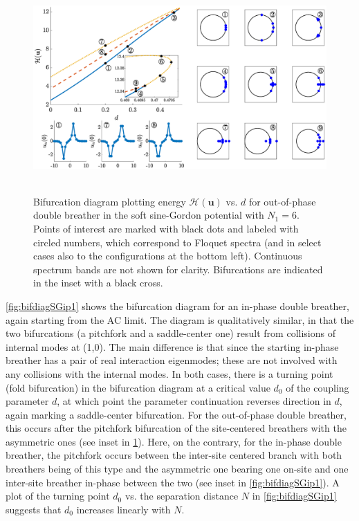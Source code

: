 \documentclass[12pt,reqno]{amsart}
\newcommand{\uvec}{\mathbf{u}}
\theoremstyle{definition}
\begin{document}
\begin{figure}
	\hbox{
	\hspace{-2cm}
	\includegraphics[width=20cm]{bifdiagSGoppositeN6.eps} 
	}
	\caption{Bifurcation diagram plotting energy $\mathcal{H}(\uvec)$ vs. $d$ for out-of-phase double breather in the soft sine-Gordon potential with $N_1 = 6$. Points of interest are marked with black dots and labeled with circled numbers, which correspond to Floquet spectra (and in select cases also to the configurations at the bottom left). Continuous spectrum bands are not shown for clarity. Bifurcations are indicated in the inset with a black cross.}
	\label{fig:bifdiagSGoop1}
\end{figure}

\cref{fig:bifdiagSGip1} shows the bifurcation diagram for an in-phase double breather, again starting from the AC limit. The diagram is qualitatively similar, in that the two bifurcations (a pitchfork
and a saddle-center one) result from collisions of internal modes at (1,0). The main difference is that since the starting in-phase breather has a pair of real interaction eigenmodes; these are not involved with any collisions with the internal modes. In both cases, there is a turning point (fold bifurcation) in the bifurcation diagram at a critical value $d_0$ of the coupling parameter $d$, at which point the parameter continuation reverses direction in $d$, again marking a saddle-center 
bifurcation. For the out-of-phase double breather, this occurs after the pitchfork bifurcation of the site-centered breathers with 
the asymmetric ones (see inset in \cref{fig:bifdiagSGoop1}).
Here, on the contrary, for the in-phase double breather, 
the pitchfork occurs between the inter-site centered
branch with both breathers being of this type and the 
asymmetric one bearing one on-site and one inter-site 
breather in-phase between the two (see inset in \cref{fig:bifdiagSGip1}). A plot of the turning point $d_0$ vs. the separation distance $N$ in \cref{fig:bifdiagSGip1} suggests that $d_0$ increases linearly with $N$.
\end{document}

